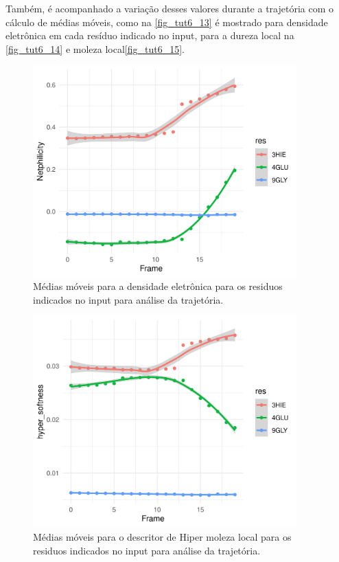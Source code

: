 \documentclass[a4paper,11pt]{refart}
\begin{document}
	 
	 Também, é acompanhado a variação desses valores durante a trajetória com o cálculo de médias móveis, como na \autoref{fig_tut6_13} é mostrado para densidade eletrônica em cada resíduo indicado no input, para a dureza local na \autoref{fig_tut6_14} e moleza local\autoref{fig_tut6_15}. 
	 
	 \hspace*{-\leftmarginwidth}
	 \begin{minipage}{\fullwidth}
	 	\begin{figure}[H]
	 		\begin{center}
	 			\includegraphics[width=4in]{net_mov_avg}
	 			\caption{Médias móveis para a densidade eletrônica para os residuos indicados no input para análise da trajetória.}
	 			\label{fig_tut6_13}
	 		\end{center}
	 	\end{figure}
	 \end{minipage}
	 
	 \hspace*{-\leftmarginwidth}
	 \begin{minipage}{\fullwidth}
	 	\begin{figure}[H]
	 		\begin{center}
	 			\includegraphics[width=4in]{Hsoftness_mov_avg}
	 			\caption{Médias móveis para o descritor de Hiper moleza local para os residuos indicados no input para análise da trajetória.}
	 			\label{fig_tut6_14}
	 		\end{center}
	 	\end{figure}
	 \end{minipage}
	 
\end{document}
